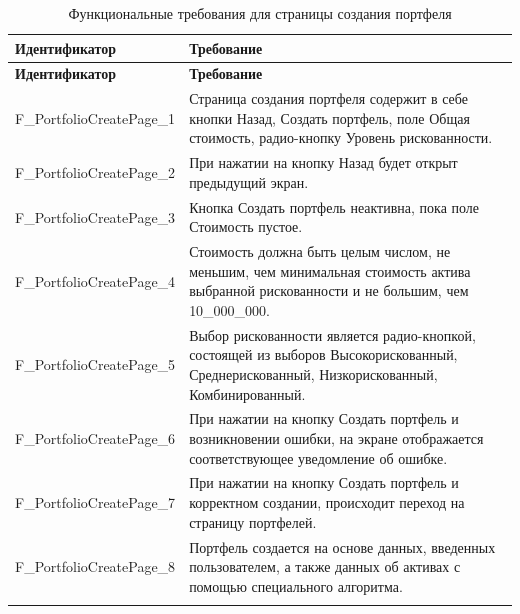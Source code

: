 \documentclass[a4paper, 14pt]{article}
\begin{document}
\begin{longtable}{| p{} | p{} |}
    \hline
    \textbf{Идентификатор}          & \textbf{Требование}                                                                                                                                                                \\
    \hline
    \endfirsthead
    \hline
    \textbf{Идентификатор}          & \textbf{Требование}                                                                                                                                                                \\
    \hline
    \endhead

    F\_PortfolioCreatePage\_1 & Страница создания портфеля содержит в себе кнопки Назад, Создать портфель, поле Общая стоимость, радио-кнопку Уровень рискованности.                                                          \\ \hline
    F\_PortfolioCreatePage\_2 & При нажатии на кнопку Назад будет открыт предыдущий экран.                                                                                                                         \\ \hline
    F\_PortfolioCreatePage\_3 & Кнопка Создать портфель неактивна, пока поле Стоимость пустое.                                                                                                                   \\ \hline
    F\_PortfolioCreatePage\_4 & Стоимость должна быть целым числом, не меньшим, чем минимальная стоимость актива выбранной рискованности и не большим, чем 10\_000\_000.                                                                                                                   \\ \hline
    F\_PortfolioCreatePage\_5 & Выбор рискованности является радио-кнопкой, состоящей из выборов Высокорискованный, Среднерискованный, Низкорискованный, Комбинированный.                                            \\ \hline
    F\_PortfolioCreatePage\_6 & При нажатии на кнопку Создать портфель и возникновении ошибки, на экране отображается соответствующее уведомление об ошибке.                           \\ \hline
    F\_PortfolioCreatePage\_7 & При нажатии на кнопку Создать портфель и корректном создании, происходит переход на страницу портфелей.                                                                 \\ \hline
    F\_PortfolioCreatePage\_8 & Портфель создается на основе данных, введенных пользователем, а также данных об активах с помощью специального алгоритма.                                                                 \\ \hline

    \caption{Функциональные требования для страницы создания портфеля}
\end{longtable}
\end{document}
